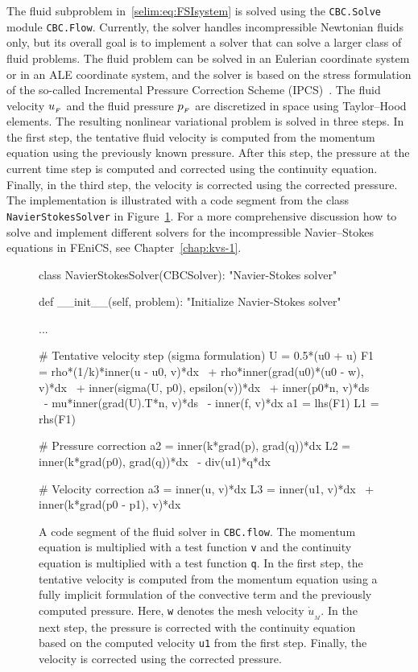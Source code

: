 The fluid subproblem in~\eqref{selim:eq:FSIsystem} is solved using the
\texttt{CBC.Solve} module \texttt{CBC.Flow}. Currently, the solver
handles incompressible Newtonian fluids only, but its overall goal is
to implement a solver that can solve a larger class of fluid problems.
The fluid problem can be solved in an Eulerian coordinate system or in
an ALE coordinate system, and the solver is based on the stress
formulation of the so-called Incremental Pressure Correction Scheme
(IPCS)~\cite{Goda1979}. The fluid velocity $u_{_{F}}$ and the fluid
pressure $p_{_{F}}$ are discretized in space using Taylor--Hood
elements. The resulting nonlinear variational problem is solved in
three steps. In the first step, the tentative fluid velocity is
computed from the momentum equation using the previously known
pressure. After this step, the pressure at the current time step is
computed and corrected using the continuity equation. Finally, in the
third step, the velocity is corrected using the corrected pressure.
The implementation is illustrated with a code segment from the class
\texttt{NavierStokesSolver} in Figure~\ref{selim:fig:fluidsolver}. For
a more comprehensive discussion how to solve and implement different
solvers for the incompressible Navier--Stokes equations in FEniCS, see
Chapter~\ref{chap:kvs-1}.
\begin{figure}
\begin{center}
\begin{python}
 class NavierStokesSolver(CBCSolver):
    "Navier-Stokes solver"

   def __init__(self, problem):
        "Initialize Navier-Stokes solver"

        ...

        # Tentative velocity step (sigma formulation)
        U = 0.5*(u0 + u)
        F1 = rho*(1/k)*inner(u - u0, v)*dx \
           + rho*inner(grad(u0)*(u0 - w), v)*dx \
           + inner(sigma(U, p0), epsilon(v))*dx \
           + inner(p0*n, v)*ds \
           - mu*inner(grad(U).T*n, v)*ds \
           - inner(f, v)*dx
        a1 = lhs(F1)
        L1 = rhs(F1)

        # Pressure correction
        a2 = inner(k*grad(p), grad(q))*dx
        L2 = inner(k*grad(p0), grad(q))*dx \
           - div(u1)*q*dx

        # Velocity correction
        a3 = inner(u, v)*dx
        L3 = inner(u1, v)*dx \
           + inner(k*grad(p0 - p1), v)*dx
\end{python}
\caption{A code segment of the fluid solver in \texttt{CBC.flow}. The
  momentum equation is multiplied with a test function \texttt{v} and
  the continuity equation is multiplied with a test function
  \texttt{q}. In the first step, the tentative velocity is computed
  from the momentum equation using a fully implicit formulation of the
  convective term and the previously computed pressure. Here, \texttt{w}
  denotes the mesh velocity $\dot{u}_{_{M}}$. In the next step, the
  pressure is corrected with the continuity equation based on the
  computed velocity \texttt{u1} from the first step. Finally, the
  velocity is corrected using the corrected pressure.}
\label{selim:fig:fluidsolver}
\end{center}
\end{figure}

